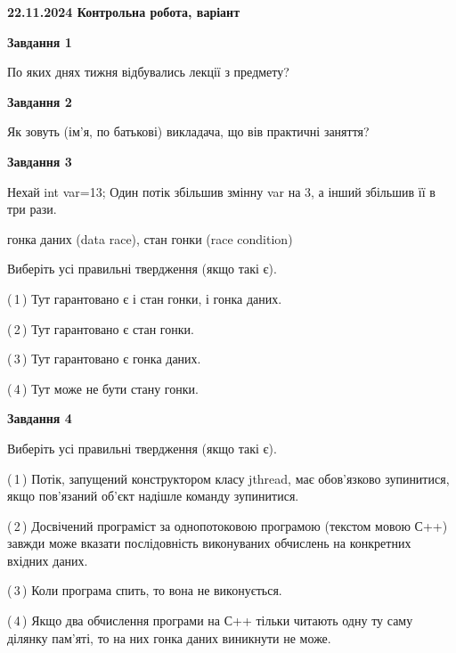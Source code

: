 \documentclass[12pt, ukrainian]{article}
\begin{document}
\begin {large}

\textbf{22.11.2024 Контрольна робота, варіант  }\par


{

\begin{center}
\textbf{Завдання 1}
\end{center}

По яких днях тижня відбувались лекції з предмету?


\begin{center}
\textbf{Завдання 2}
\end{center}

Як зовуть (ім'я, по батькові) викладача, що вів практичні заняття?


\begin{center}
\textbf{Завдання 3}
\end{center}

Нехай int var=13; Один потік збільшив змінну var на 3, а інший збільшив її в три рази.

гонка даних (data race), стан гонки (race condition)

Виберіть усі правильні твердження (якщо такі є).\par
\vspace{2mm}
(\,1\,) Тут гарантовано є і стан гонки, і гонка даних.%

(\,2\,) Тут гарантовано є стан гонки.%

(\,3\,) Тут гарантовано є гонка даних.%

(\,4\,) Тут може не бути стану гонки.%


\begin{center}
\textbf{Завдання 4}
\end{center}

Виберіть усі правильні твердження (якщо такі є).\par
\vspace{2mm}

(\,1\,) Потік, запущений конструктором класу jthread, має обов’язково зупинитися, якщо пов’язаний об’єкт надішле команду зупинитися.%

(\,2\,) Досвічений програміст за однопотоковою програмою (текстом мовою С++) завжди може вказати послідовність виконуваних обчислень на конкретних вхідних даних.%

(\,3\,) Коли програма спить, то вона не виконується.%

(\,4\,) Якщо два обчислення програми на С++ тільки читають одну ту саму ділянку пам'яті, то на них гонка даних  виникнути не може.%


}
\end{large}
\end{document}
